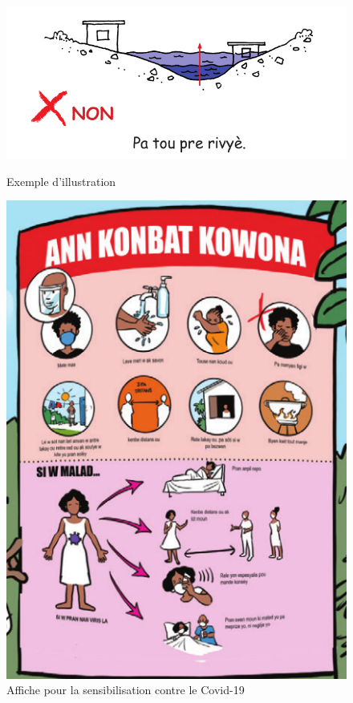 \begin{figure}[h]
	\begin{minipage}{0.5\textwidth}
		\centering
		\includegraphics[width=\textwidth]{Pictures/KonstuiBoLarivye.png}
		\caption{Exemple d'illustration}
		\label{FigKonstuiBoRivye}
	\end{minipage}
	\begin{minipage}{0.5\textwidth}
		\centering
		\includegraphics[height=0.3\textheight]{Pictures/AfichKontKowona.png}
		\caption{Affiche pour la sensibilisation contre le Covid-19}
		\label{LaveMenNouPouNouPaTrapeKowona}
	\end{minipage}
\end{figure}








